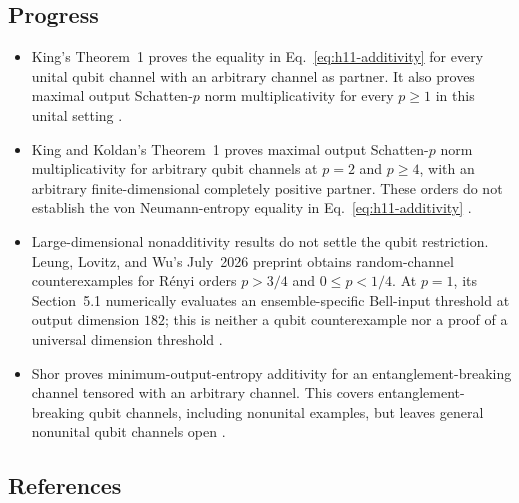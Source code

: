 \subsection*{Progress}

\begin{itemize}
  \item King's Theorem~1 proves the equality in Eq.~\eqref{eq:h11-additivity} for every unital qubit channel with an arbitrary channel as partner. It also proves maximal output Schatten-$p$ norm multiplicativity for every $p\geq1$ in this unital setting .

  \item King and Koldan's Theorem~1 proves maximal output Schatten-$p$ norm multiplicativity for arbitrary qubit channels at $p=2$ and $p\geq4$, with an arbitrary finite-dimensional completely positive partner. These orders do not establish the von Neumann-entropy equality in Eq.~\eqref{eq:h11-additivity} .

  \item Large-dimensional nonadditivity results do not settle the qubit restriction. Leung, Lovitz, and Wu's July~2026 preprint obtains random-channel counterexamples for R\'enyi orders $p>3/4$ and $0\leq p<1/4$. At $p=1$, its Section~5.1 numerically evaluates an ensemble-specific Bell-input threshold at output dimension $182$; this is neither a qubit counterexample nor a proof of a universal dimension threshold .

  \item Shor proves minimum-output-entropy additivity for an entanglement-breaking channel tensored with an arbitrary channel. This covers entanglement-breaking qubit channels, including nonunital examples, but leaves general nonunital qubit channels open .
\end{itemize}

\subsection*{References}

